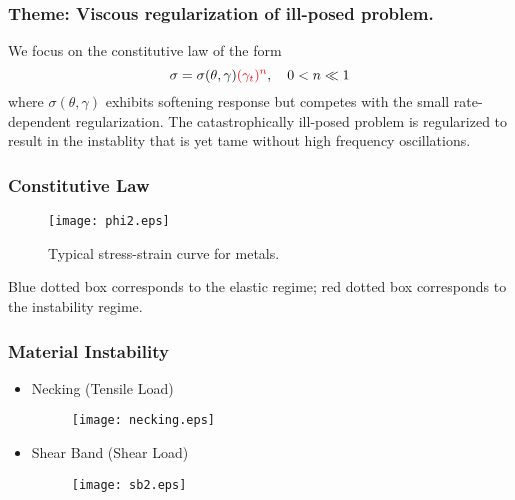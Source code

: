\documentclass{beamer}
\def\red{\color{red}}
\def\blue{\color{blue}}
\begin{document}
\begin{frame}
 \frametitle{Theme: Viscous regularization of ill-posed problem.}
 We focus on the constitutive law of the form
$$\sigma=\sigma(\theta,\gamma){\red (\gamma_t)^n}, \quad 0<n\ll1$$
where $\sigma(\theta,\gamma)$ exhibits {\blue softening response} but competes with the {\blue small rate-dependent} regularization.
 \vfill
The catastrophically ill-posed problem is regularized to result in the instablity that is yet tame without high frequency oscillations.
 \vfill
\end{frame}

\begin{frame}
 \frametitle{Constitutive Law}
 \begin{figure}
    \centering
    \center
    \texttt{[image: phi2.eps]} 
    \caption{Typical stress-strain curve for metals.}
 \end{figure} 
 Blue dotted box corresponds to the elastic regime; red dotted box corresponds to the instability regime.
 \vfill
\end{frame}

\begin{frame}
 \frametitle{Material Instability}
 \begin{itemize}
  \item Necking (Tensile Load)
   \begin{figure}
    \centering
      \texttt{[image: necking.eps]} 
    \end{figure} 
  \item Shear Band (Shear Load)
     \begin{figure}
    \centering
      \texttt{[image: sb2.eps]} 
    \end{figure} 
 \end{itemize}
 \vfill
\end{frame}
\end{document}
